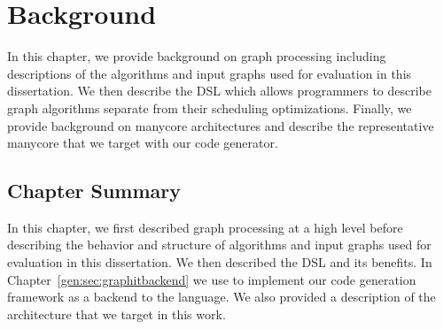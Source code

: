 \chapter{Background}\label{gen:sec:background}

In this chapter, we provide background on graph processing including descriptions of the algorithms and input graphs used for evaluation in this dissertation.
We then describe the \graphit DSL which allows programmers to describe graph algorithms separate from their scheduling optimizations.
Finally, we provide background on manycore architectures and describe the representative manycore that we target with our code generator. 







\section{Chapter Summary}
In this chapter, we first described graph processing at a high level before describing the behavior and structure of algorithms and input graphs used for evaluation in this dissertation.
We then described the \graphit DSL and its benefits.
In Chapter~\ref{gen:sec:graphitbackend} we use \graphit to implement our code generation framework as a backend to the language.
We also provided a description of the \hbmc architecture that we target in this work.